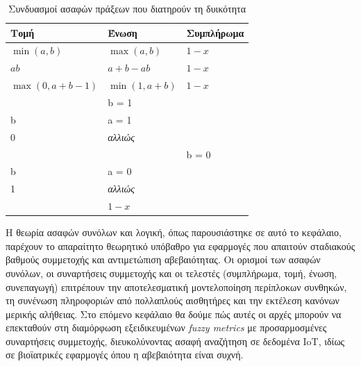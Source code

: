 \begin{table}[h!]
    \centering
    \begin{tabularx}{\textwidth}{X X X}
        \textbf{Τομή} & \textbf{Ένωση} & \textbf{Συμπλήρωμα} \\
        \hline
         \rule{0pt}{3ex}\(\min(a,b)\) & \(\max(a,b)\) & \(1-x\) \\
         \rule{0pt}{3ex}\(ab\) & \(a + b - ab\) & \(1-x\) \\
         \rule{0pt}{3ex}\(\max(0, a+b-1)\) & \(\min(1, a + b)\) & \(1-x\) \\
         \rule{0pt}{5ex}\(\left\{
            \begin{array}{ll}
                  a & b = 1 \\
                  b & a = 1 \\
                  0 & \textit{αλλιώς}\\
            \end{array} 
            \right.\) & \(\left\{
            \begin{array}{ll}
                  a & b = 0 \\
                  b & a = 0 \\
                  1 & \textit{αλλιώς}\\
            \end{array} 
            \right.\) & \(1-x\)
    \end{tabularx}
    \caption{Συνδυασμοί ασαφών πράξεων που διατηρούν τη δυικότητα}
    \label{tab:comb}
\end{table}

  Η θεωρία ασαφών συνόλων και λογική, όπως παρουσιάστηκε σε αυτό το κεφάλαιο, παρέχουν το απαραίτητο θεωρητικό υπόβαθρο για εφαρμογές που απαιτούν σταδιακούς βαθμούς συμμετοχής και αντιμετώπιση αβεβαιότητας.
  Οι ορισμοί των ασαφών συνόλων, οι συναρτήσεις συμμετοχής και οι τελεστές (συμπλήρωμα, τομή, ένωση, συνεπαγωγή) επιτρέπουν την αποτελεσματική μοντελοποίηση περίπλοκων συνθηκών,
  τη συνένωση πληροφοριών από πολλαπλούς αισθητήρες και την εκτέλεση κανόνων μερικής αλήθειας. 
  Στο επόμενο κεφάλαιο θα δούμε πώς αυτές οι αρχές μπορούν να επεκταθούν στη διαμόρφωση εξειδικευμένων \emph{\textlatin{fuzzy metrics}} με προσαρμοσμένες συναρτήσεις συμμετοχής,
  διευκολύνοντας ασαφή αναζήτηση σε δεδομένα \textlatin{IoT}, ιδίως σε βιοϊατρικές εφαρμογές όπου η αβεβαιότητα είναι συχνή.